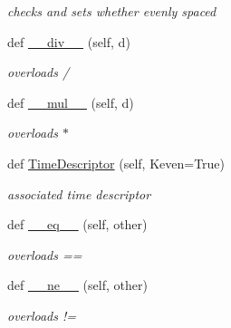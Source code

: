 \begin{DoxyCompactItemize}
\begin{DoxyCompactList}\small\item\em checks and sets whether evenly spaced \end{DoxyCompactList}\item 
def \hyperlink{classSignalIntegrity_1_1FrequencyDomain_1_1FrequencyList_1_1FrequencyList_a5780a728adfb401a59d29d748b4abf91}{\+\_\+\+\_\+div\+\_\+\+\_\+} (self, d)
\begin{DoxyCompactList}\small\item\em overloads / \end{DoxyCompactList}\item 
def \hyperlink{classSignalIntegrity_1_1FrequencyDomain_1_1FrequencyList_1_1FrequencyList_a07c88d52e0963bb0c56e013184cd0d24}{\+\_\+\+\_\+mul\+\_\+\+\_\+} (self, d)
\begin{DoxyCompactList}\small\item\em overloads $\ast$ \end{DoxyCompactList}\item 
def \hyperlink{classSignalIntegrity_1_1FrequencyDomain_1_1FrequencyList_1_1FrequencyList_ae0cb8207edfbc631f1af2fc543e3d4d7}{Time\+Descriptor} (self, Keven=True)
\begin{DoxyCompactList}\small\item\em associated time descriptor \end{DoxyCompactList}\item 
def \hyperlink{classSignalIntegrity_1_1FrequencyDomain_1_1FrequencyList_1_1FrequencyList_ad794ff077f2f05f228a7109f3670ac40}{\+\_\+\+\_\+eq\+\_\+\+\_\+} (self, other)
\begin{DoxyCompactList}\small\item\em overloads == \end{DoxyCompactList}\item 
def \hyperlink{classSignalIntegrity_1_1FrequencyDomain_1_1FrequencyList_1_1FrequencyList_aa0b54a20b36fcc55e1147de88d083072}{\+\_\+\+\_\+ne\+\_\+\+\_\+} (self, other)
\begin{DoxyCompactList}\small\item\em overloads != \end{DoxyCompactList}\end{DoxyCompactItemize}
